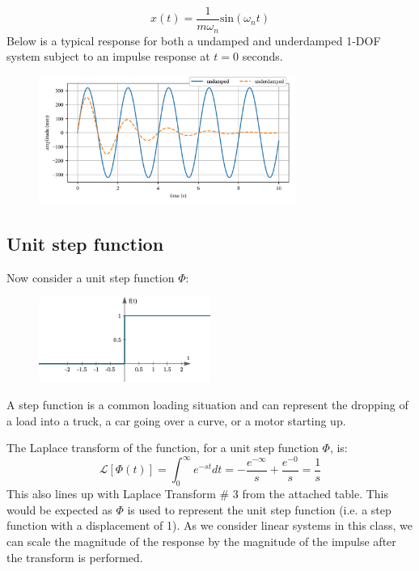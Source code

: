 \documentclass[12pt,a4paper]{article}
\newcommand{\Laplace}[1]{\ensuremath{\mathcal{L}{\left[#1\right]}}}
\begin{document}
\begin{equation}
x(t) = \frac{1}{m \omega_n}\text{sin}(\omega_n t)
\end{equation}
Below is a typical response for both a undamped and underdamped 1-DOF system subject to an impulse response at $t=0$ seconds. 
\begin{figure}[H]
	\centering
	\includegraphics[width=0.75\textwidth]{../../Figures/response_impulse.png}
\end{figure}



\subsection*{Unit step function}
Now consider a unit step function $\Phi$: 

\begin{figure}[H]
	\centering
	\includegraphics[width=0.5\textwidth]{../../Figures/unit_step_function.png}
\end{figure}

A step function is a common loading situation and can represent the dropping of a load into a truck, a car going over a curve, or a motor starting up. 


The Laplace transform of the function, for a unit step function $\Phi$, is: 
\begin{equation*}
\Laplace{\Phi(t)} = \int_{0}^{\infty} e^{-st}dt = -\frac{e^{-\infty}}{s} +\frac{e^{-0}}{s} =\frac{1}{s}
\end{equation*}
This also lines up with Laplace Transform \# 3 from the attached table. This would be expected as $\Phi$ is used to represent the unit step function (i.e. a step function with a displacement of 1). As we consider linear systems in this class, we can scale the magnitude of the response by the magnitude of the impulse after the transform is performed. 
\end{document}
